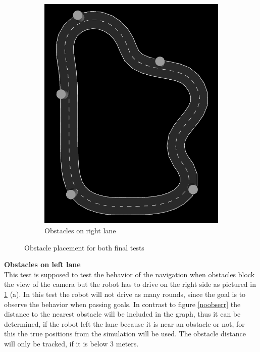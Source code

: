 \begin{figure}[H]
\begin{subfigure}{.5\linewidth}
		\includegraphics[width=\textwidth]{Pictures/right final obs}
		\caption{Obstacles on right lane}
	\end{subfigure}

	\caption{Obstacle placement for both final tests}
	\label{obstaclefinaltest}

\end{figure}
\textbf{Obstacles on left lane}\\
This test is supposed to test the behavior of the navigation when obstacles block the view of the camera but the robot has to drive on the right side as pictured in \ref{obstaclefinaltest} (a). In this test the robot will not drive as many rounds, since the goal is to observe the behavior when passing goals. In contrast to figure \ref{noobserr} the distance to the nearest obstacle will be included in the graph, thus it can be determined, if the robot left the lane because it is near an obstacle or not, for this the true positions from the simulation will be used. The obstacle distance will only be tracked, if it is below 3 meters.
